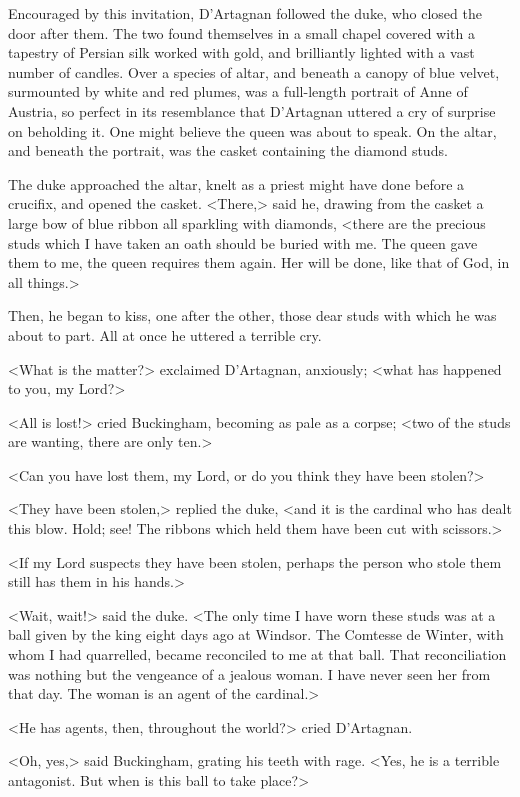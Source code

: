 Encouraged by this invitation, D'Artagnan followed the duke, who closed the door after them. The two found themselves in a small chapel covered with a tapestry of Persian silk worked with gold, and brilliantly lighted with a vast number of candles. Over a species of altar, and beneath a canopy of blue velvet, surmounted by white and red plumes, was a full-length portrait of Anne of Austria, so perfect in its resemblance that D'Artagnan uttered a cry of surprise on beholding it. One might believe the queen was about to speak. On the altar, and beneath the portrait, was the casket containing the diamond studs. 

The duke approached the altar, knelt as a priest might have done before a crucifix, and opened the casket. <There,> said he, drawing from the casket a large bow of blue ribbon all sparkling with diamonds, <there are the precious studs which I have taken an oath should be buried with me. The queen gave them to me, the queen requires them again. Her will be done, like that of God, in all things.> 

Then, he began to kiss, one after the other, those dear studs with which he was about to part. All at once he uttered a terrible cry. 

<What is the matter?> exclaimed D'Artagnan, anxiously; <what has happened to you, my Lord?> 

<All is lost!> cried Buckingham, becoming as pale as a corpse; <two of the studs are wanting, there are only ten.> 

<Can you have lost them, my Lord, or do you think they have been stolen?> 

<They have been stolen,> replied the duke, <and it is the cardinal who has dealt this blow. Hold; see! The ribbons which held them have been cut with scissors.> 

<If my Lord suspects they have been stolen, perhaps the person who stole them still has them in his hands.> 

<Wait, wait!> said the duke. <The only time I have worn these studs was at a ball given by the king eight days ago at Windsor. The Comtesse de Winter, with whom I had quarrelled, became reconciled to me at that ball. That reconciliation was nothing but the vengeance of a jealous woman. I have never seen her from that day. The woman is an agent of the cardinal.> 

<He has agents, then, throughout the world?> cried D'Artagnan. 

<Oh, yes,> said Buckingham, grating his teeth with rage. <Yes, he is a terrible antagonist. But when is this ball to take place?> 

